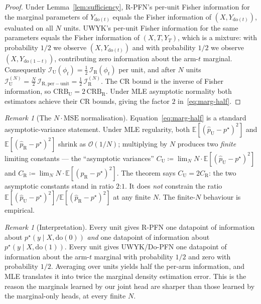 \documentclass[11pt]{article}
\theoremstyle{remark}
\newtheorem{remark}[theorem]{Remark}
\newcommand{\EE}{\mathbb{E}}
\newcommand{\Ino}{\mathcal{I}}
\begin{document}
\begin{proof}
Under Lemma~\ref{lem:sufficiency}, R-PFN's per-unit Fisher information
for the marginal parameters of $Y_{\mathrm{do}(t)}$ equals the Fisher
information of $(X, Y_{\mathrm{do}(t)})$, evaluated on all $N$ units.
UWYK's per-unit Fisher information for the same parameters equals the
Fisher information of $(X, T, Y_T)$, which is a mixture: with
probability $1/2$ we observe $(X, Y_{\mathrm{do}(t)})$ and with
probability $1/2$ we observe $(X, Y_{\mathrm{do}(1-t)})$, contributing
zero information about the arm-$t$ marginal. Consequently
$\Ino_{\mathrm{U}}(\phi_t) = \tfrac{1}{2}\,\Ino_{\mathrm{R}}(\phi_t)$
per unit, and after $N$ units
$\Ino_{\mathrm{U}}^{(N)} = \tfrac{N}{2}\,\Ino_{\mathrm{R,per-unit}} = \tfrac{1}{2}\,\Ino_{\mathrm{R}}^{(N)}$.
The CR bound is the inverse of Fisher information, so
$\mathrm{CRB}_{\mathrm{U}} = 2\,\mathrm{CRB}_{\mathrm{R}}$. Under MLE
asymptotic normality both estimators achieve their CR bounds, giving
the factor $2$ in~\eqref{eq:marg-half}.
\end{proof}

\begin{remark}[The $N \cdot \mathrm{MSE}$ normalisation]
\label{rem:asymptotic-variance}
Equation~\eqref{eq:marg-half} is a standard asymptotic-variance
statement. Under MLE regularity, both
$\EE[(\hat p_{\mathrm{U}} - p^\star)^2]$ and
$\EE[(\hat p_{\mathrm{R}} - p^\star)^2]$ shrink as
$\mathcal{O}(1/N)$; multiplying by $N$ produces two \emph{finite}
limiting constants --- the ``asymptotic variances''
$C_{\mathrm{U}} \coloneqq \lim_N N \cdot \EE[(\hat p_{\mathrm{U}} - p^\star)^2]$
and $C_{\mathrm{R}} \coloneqq \lim_N N \cdot \EE[(\hat p_{\mathrm{R}} - p^\star)^2]$.
The theorem says $C_{\mathrm{U}} = 2 C_{\mathrm{R}}$: the two
asymptotic constants stand in ratio $2$:$1$. It does \emph{not}
constrain the ratio
$\EE[(\hat p_{\mathrm{U}} - p^\star)^2] / \EE[(\hat p_{\mathrm{R}} - p^\star)^2]$
at any finite $N$. The finite-$N$ behaviour is empirical.
\end{remark}

\begin{remark}[Interpretation]
Every unit gives R-PFN one datapoint of information about
$p^\star(y \mid X, \mathrm{do}(0))$ \emph{and} one datapoint of
information about $p^\star(y \mid X, \mathrm{do}(1))$. Every unit
gives UWYK/Do-PFN one datapoint of information about the arm-$t$
marginal with probability $1/2$ and zero with probability $1/2$.
Averaging over units yields half the per-arm information, and MLE
translates it into twice the marginal density estimation error. This
is the reason the marginals learned by our joint head are sharper
than those learned by the marginal-only heads, at every finite $N$.
\end{remark}
\end{document}

